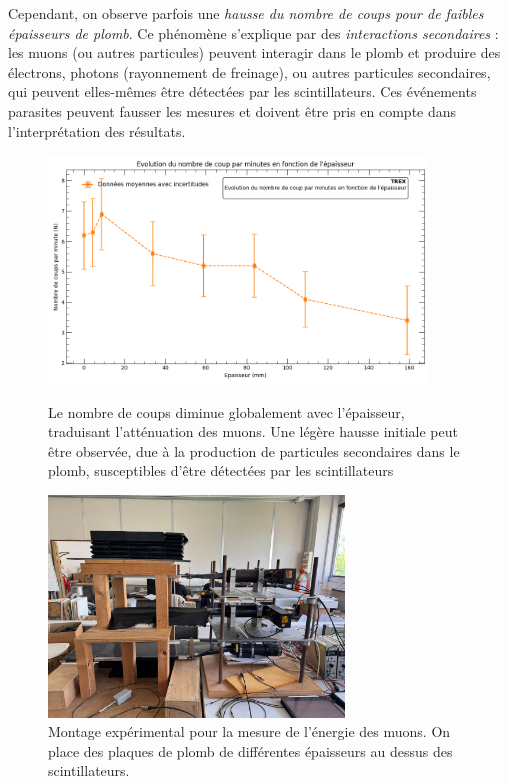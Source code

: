 \documentclass[a4paper,12pt,twoside]{article}
\begin{document}
Cependant, on observe parfois une \textit{hausse du nombre de coups pour de faibles épaisseurs de plomb}. Ce phénomène s’explique par des \textit{interactions secondaires} : les muons (ou autres particules) peuvent interagir dans le plomb et produire des électrons, photons (rayonnement de freinage), ou autres particules secondaires, qui peuvent elles-mêmes être détectées par les scintillateurs. Ces événements parasites peuvent fausser les mesures et doivent être pris en compte dans l’interprétation des résultats.

\begin{figure}[!h]
  \begin{minipage}
  {0.49\textwidth}
  \centering
  \includegraphics[width=0.9\textwidth]{Images/energie.png}
  \caption{Le nombre de coups diminue globalement avec l’épaisseur, traduisant l’atténuation des muons. Une légère hausse initiale peut être observée, due à la production de particules secondaires dans le plomb, susceptibles d’être détectées par les scintillateurs }

  \label{fig:energie_1}
  \end{minipage}
  \hfill
  \begin{minipage}{0.45\textwidth}
  \centering
  \includegraphics[width=0.7\textwidth]{Images/plomb.jpg}
  \caption{Montage expérimental pour la mesure de l’énergie des muons. On place des plaques de plomb de différentes épaisseurs au dessus des scintillateurs.}
  \label{fig:energie_2}
  \end{minipage}
  \end{figure}
\end{document}
